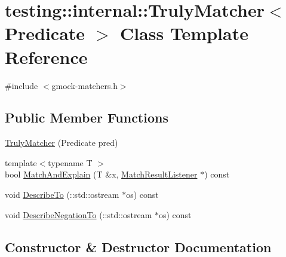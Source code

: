 \hypertarget{classtesting_1_1internal_1_1_truly_matcher}{}\section{testing\+:\+:internal\+:\+:Truly\+Matcher$<$ Predicate $>$ Class Template Reference}
\label{classtesting_1_1internal_1_1_truly_matcher}


{\ttfamily \#include $<$gmock-\/matchers.\+h$>$}

\subsection*{Public Member Functions}
\begin{DoxyCompactItemize}
\item 
\hyperlink{classtesting_1_1internal_1_1_truly_matcher_a9fdc4ddba121e0dad4773b5685e0f28d}{Truly\+Matcher} (Predicate pred)
\item 
{\footnotesize template$<$typename T $>$ }\\bool \hyperlink{classtesting_1_1internal_1_1_truly_matcher_ad3781c661936a845ec165c1aad239634}{Match\+And\+Explain} (T \&x, \hyperlink{classtesting_1_1_match_result_listener}{Match\+Result\+Listener} $\ast$) const
\item 
void \hyperlink{classtesting_1_1internal_1_1_truly_matcher_ac327b4bd408386f489c4279e7e3f9530}{Describe\+To} (\+::std\+::ostream $\ast$os) const
\item 
void \hyperlink{classtesting_1_1internal_1_1_truly_matcher_a2e753f5d571b6a51b8ef620dcbb3a591}{Describe\+Negation\+To} (\+::std\+::ostream $\ast$os) const
\end{DoxyCompactItemize}


\subsection{Constructor \& Destructor Documentation}
\mbox{\label{classtesting_1_1internal_1_1_truly_matcher_a9fdc4ddba121e0dad4773b5685e0f28d}} 
